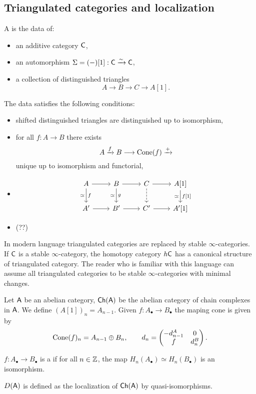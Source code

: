\subsection{Triangulated categories and localization}
\begin{definition}
A  is the data of:
\begin{itemize}
\item an additive category $\mathsf{C}$,
\item an automorphism $\Sigma=(-)[1]:\mathsf{C}\xrightarrow{\sim} \mathsf{C}$,
\item a collection of distinguished triangles
	\[
		A \to B \to C \to A[1]
	.\]
\end{itemize}
The data satisfies the following conditions:
\begin{itemize}
\item shifted distinguished triangles are distinguished up to isomorphism,
\item for all $f:A\to B$ there exists
	\[
		A \xrightarrow{f} B \to \Cone(f) \xrightarrow{+}
	\]
	unique up to isomorphism and functorial,
\item
	\begin{equation*}
		\begin{tikzcd}
			A \ar[r] \ar[d,"f","\simeq"'] & B \ar[r] \ar[d,"g","\simeq"'] & C \ar[d,dashed] \ar[r]
			& A[1] \ar[d,"{f[1]}","\simeq"'] \\
			A' \ar[r] & B' \ar[r] & C' \ar[r] & A'[1]
		\end{tikzcd}
	\end{equation*}	
\item (??)
\end{itemize}
\end{definition}

\begin{remark}
In modern language triangulated categories are replaced by stable $\infty$-categories. If
$\mathsf{C}$ is a stable $\infty$-category, the homotopy category $h\mathsf{C}$ has a canonical structure
of triangulated category. The reader who is familiar with this language can assume all
triangulated categories to be stable $\infty$-categories with minimal changes.
\end{remark}

\begin{example}
Let $\mathsf{A}$ be an abelian category, $\mathsf{Ch}(\mathsf{A})$ be the abelian category of chain complexes in
$\mathsf{A}$. We define $(A[1])_n = A_{n-1}$. Given $f:A_\bullet\to B_\bullet$ the maping cone is given by
\[
\operatorname{Cone}(f)_n = A_{n-1} \oplus B_n,\qquad d_n =
\begin{pmatrix} -d_{n-1}^{A} & 0 \\ f & d_n^{B}
\end{pmatrix}
.\]
\end{example}
\begin{definition}
$f:A_\bullet\to B_\bullet$ is a  if for all $n\in \mathbb Z$, the map
$H_n(A_\bullet)\simeq H_n(B_\bullet)$ is an isomorphism.
\end{definition}
\begin{definition}
$D(\mathsf{A})$ is defined as the localization of $\mathsf{Ch}(\mathsf{A})$ by quasi-isomorphisms.
\end{definition}

